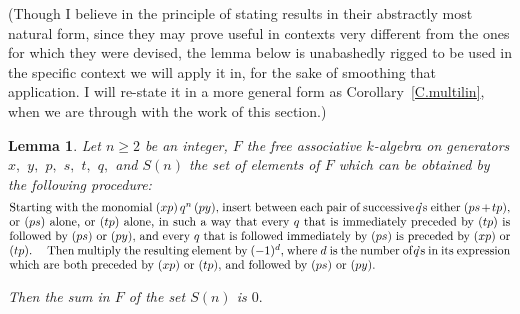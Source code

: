 \documentclass{amsart}
\newtheorem{lemma}[theorem]{Lemma}
\begin{document}
(Though I believe in the principle of stating results in their
abstractly most natural form, since they may prove useful in
contexts very different from the ones for which they were
devised, the lemma below is unabashedly rigged to be used in
the specific context we will apply it in, for the sake of smoothing
that application.
I will re-state it in a more general form as
Corollary~\ref{C.multilin},
when we are through with the work of this section.)

\begin{lemma}\label{L.identity}
Let $n\geq 2$ be an integer, $F$ the free associative
$\!k\!$-algebra on generators $x,$ $y,$ $p,$ $s,$ $t,$ $q,$ and
$S(n)$ the set of elements of $F$ which can be obtained by the
following procedure:
\begin{equation}\begin{minipage}[c]{35pc}\label{d.insert}
Starting with the monomial $(xp)\,q^n\,(py),$ insert between
each pair of successive $\!q\!$'s either $(ps+tp),$ or $(ps)$
alone, or $(tp)$ alone, in such a way that every $q$ that is
immediately preceded by $(tp)$
is followed by $(ps)$ or $(py),$ and
every $q$ that is followed immediately by $(ps)$
is preceded by $(xp)$ or $(tp).$

\hspace*{1em}Then multiply the resulting element by
$(-1)^d,$ where $d$ is the number
of $\!q\!$'s in its expression which are both preceded by
$(xp)$ or $(tp),$ and followed by $(ps)$ or $(py).$
\end{minipage}\end{equation}

Then the sum in $F$ of the set $S(n)$ is $0.$
\end{lemma}
\end{document}
